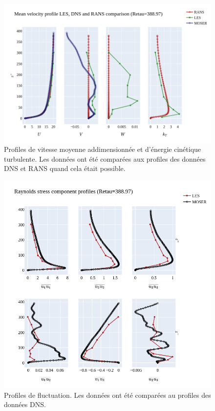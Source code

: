 \documentclass[12pt]{article}
\theoremstyle{plain}
\theoremstyle{remark}
\begin{document}
\begin{figure}[h!]
	\begin{center}
		\includegraphics[width=0.8\linewidth]{../../output/figures/channel_wrles_retau395/split_time/RANS/RANS_LES_MOSER_profiles_all.png}
		\caption{Profiles de vitesse moyenne addimensionnée et d'énergie cinétique turbulente. Les données ont été comparées aux profiles des données DNS et RANS quand cela était possible.}
		\label{fig:mean-vel}
	\end{center}
\end{figure}

\begin{figure}[h!]
	\begin{center}
		\includegraphics[width=0.8\linewidth]{../../output/figures/channel_wrles_retau395/split_time/RANS/var_velocity_profiles_all.png}
		\caption{Profiles de fluctuation. Les données ont été comparées au profiles des données DNS.}
		\label{fig:fluct-vel}
	\end{center}
\end{figure}
\end{document}
